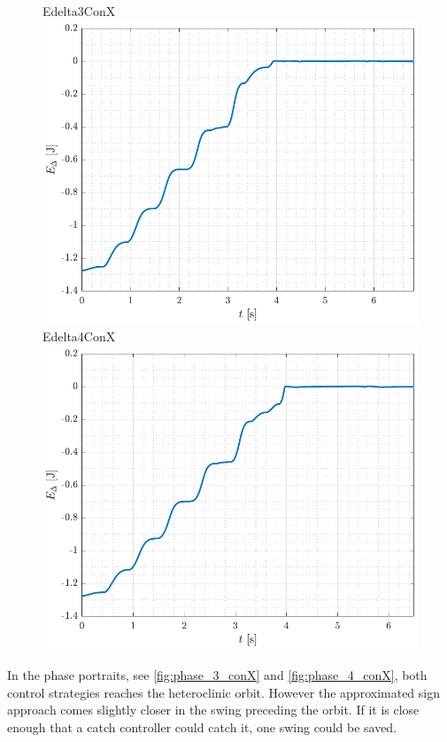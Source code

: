 \begin{figure}[H]
  \hspace{-10pt}
  \captionbox
  {
    Edelta3ConX
    \label{fig:Edelta_3_conX}
  }
  {
    \hspace{-1cm}
    \includegraphics[width=.46\textwidth]{figures/Edelta_3_conX}
  }
  \hspace{20pt}
  \captionbox 
  {
    Edelta4ConX
    \label{fig:Edelta_4_conX}
  }
  {
    \hspace{-1cm}
    \includegraphics[width=.46\textwidth]{figures/Edelta_4_conX}
  }  
\end{figure}
%
In the phase portraits, see \autoref{fig:phase_3_conX} and \ref{fig:phase_4_conX}, both control strategies reaches the heteroclinic orbit. However the approximated sign approach comes slightly closer in the swing preceding the orbit. If it is close enough that a catch controller could catch it, one swing could be saved.
